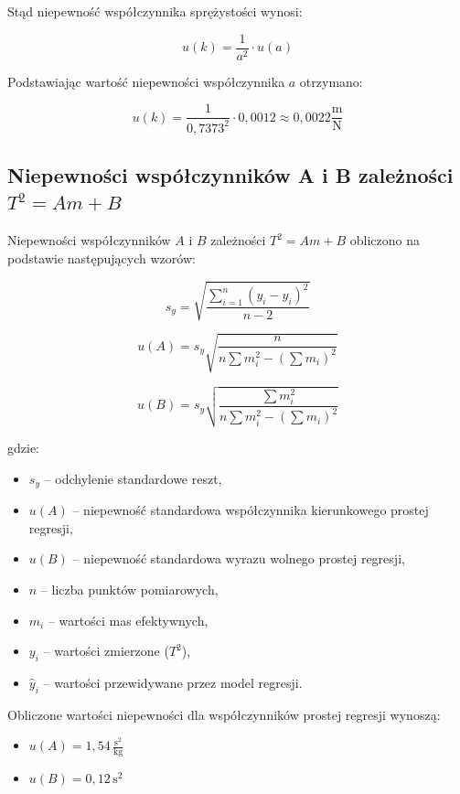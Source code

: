 \documentclass[a4paper,12pt]{article}
\begin{document}
Stąd niepewność współczynnika sprężystości wynosi:

\begin{equation*}
    u(k) =  \frac{1}{a^2} \cdot u(a)
\end{equation*}

Podstawiając wartość niepewności współczynnika $a$ otrzymano:

\begin{equation*}
    u(k) =  \frac{1}{0{,}7373^2} \cdot 0,0012 \approx 0,0022 \frac{\text{m}}{\text{N}}
\end{equation*}



\subsection{Niepewności współczynników A i B zależności $T^2 = Am + B$}

Niepewności współczynników $A$ i $B$ zależności $T^2 = Am + B$ obliczono na podstawie następujących wzorów:

\[
    s_y = \sqrt{\frac{\sum_{i=1}^{n} (y_i - \hat{y}_i)^2}{n-2}}
\]

\[
    u(A) = s_y \sqrt{\frac{n}{n \sum m_i^2 - \left( \sum m_i \right)^2}}
\]

\[
    u(B) = s_y \sqrt{\frac{\sum m_i^2}{n \sum m_i^2 - \left( \sum m_i \right)^2}}
\]

gdzie:
\begin{itemize}
    \setlength{\itemsep}{0em}
    \item $s_y$ -- odchylenie standardowe reszt,
    \item $u(A)$ -- niepewność standardowa współczynnika kierunkowego prostej regresji,
    \item $u(B)$ -- niepewność standardowa wyrazu wolnego prostej regresji,
    \item $n$ -- liczba punktów pomiarowych,
    \item $m_i$ -- wartości mas efektywnych,
    \item $y_i$ -- wartości zmierzone ($T^2$),
    \item $\hat{y}_i$ -- wartości przewidywane przez model regresji.
\end{itemize}

Obliczone wartości niepewności dla współczynników prostej regresji wynoszą:

\begin{itemize}
    \setlength{\itemsep}{0em}
    \item $u(A) = 1{,}54\,\frac{\text{s}^2}{\text{kg}}$
    \item $u(B) = 0{,}12\,\text{s}^2$
\end{itemize}
\end{document}
